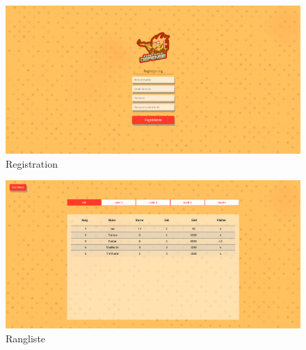 \documentclass[letterpaper, 10 pt, conference]{ieeeconf}
\begin{document}
\newpage

\begin{figure}[ht]
	\centering
	\includegraphics[width=\linewidth]{images/registration}
	\caption{Registration}
	\label{fig:registration}
\end{figure}

\begin{figure}[ht]
	\centering
	\includegraphics[width=\linewidth]{images/scoreboard}
	\caption{Rangliste}
	\label{fig:scoreboard}
\end{figure}
\end{document}
